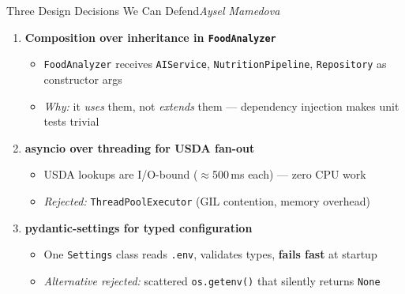 \documentclass[aspectratio=169,10pt]{beamer}
\newcommand{\speaker}[1]{\hfill{\normalfont\footnotesize\itshape #1}}
\begin{document}
\begin{frame}{Three Design Decisions We Can Defend\speaker{Aysel Mamedova}}
  \small
  \begin{enumerate}\setlength\itemsep{0.55em}
    \item \textbf{Composition over inheritance in \texttt{FoodAnalyzer}}
      \begin{itemize}
        \item \texttt{FoodAnalyzer} receives \texttt{AIService}, \texttt{NutritionPipeline}, \texttt{Repository} as constructor args
        \item \textit{Why:} it \emph{uses} them, not \emph{extends} them --- dependency injection makes unit tests trivial
      \end{itemize}

    \item \textbf{asyncio over threading for USDA fan-out}
      \begin{itemize}
        \item USDA lookups are I/O-bound (\(\approx\)500\,ms each) --- zero CPU work
        \item \textit{Rejected:} \texttt{ThreadPoolExecutor} (GIL contention, memory overhead)
      \end{itemize}

    \item \textbf{pydantic-settings for typed configuration}
      \begin{itemize}
        \item One \texttt{Settings} class reads \texttt{.env}, validates types, \textbf{fails fast} at startup
        \item \textit{Alternative rejected:} scattered \texttt{os.getenv()} that silently returns \texttt{None}
      \end{itemize}
  \end{enumerate}
\end{frame}
\end{document}
